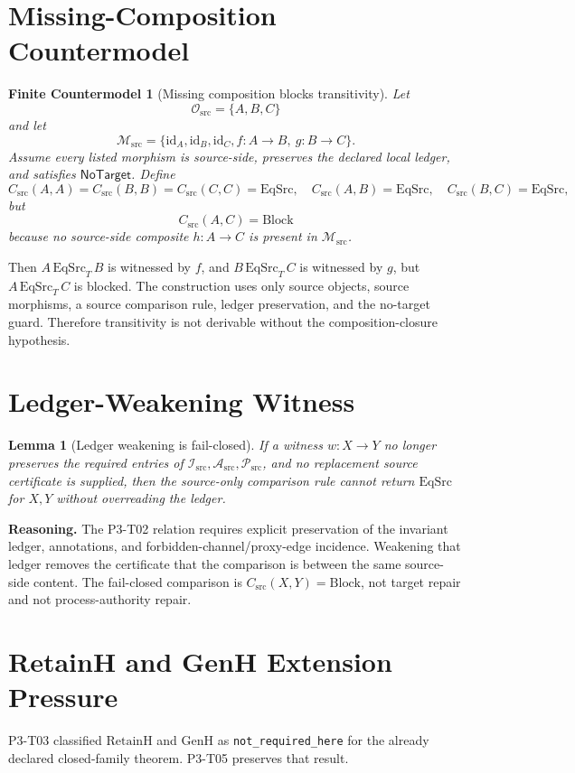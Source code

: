 \documentclass[11pt]{article}
\newcommand{\EqSrc}{\mathrm{EqSrc}}
\newcommand{\EqSrcT}{\mathrm{EqSrc}_{T}}
\newcommand{\Block}{\mathrm{Block}}
\newcommand{\RetainH}{\mathrm{RetainH}}
\newcommand{\GenH}{\mathrm{GenH}}
\newcommand{\Osrc}{\mathcal{O}_{\mathrm{src}}}
\newcommand{\Msrc}{\mathcal{M}_{\mathrm{src}}}
\newcommand{\Isrc}{\mathcal{I}_{\mathrm{src}}}
\newcommand{\Asrc}{\mathcal{A}_{\mathrm{src}}}
\newcommand{\Psrc}{\mathcal{P}_{\mathrm{src}}}
\newcommand{\Csrc}{C_{\mathrm{src}}}
\newcommand{\NoTarget}{\mathsf{NoTarget}}
\newtheorem{countermodel}{Finite Countermodel}
\newtheorem{lemma}{Lemma}
\begin{document}
\section{Missing-Composition Countermodel}

\begin{countermodel}[Missing composition blocks transitivity]
Let
\[
  \Osrc=\{A,B,C\}
\]
and let
\[
  \Msrc=\{\mathrm{id}_{A},\mathrm{id}_{B},\mathrm{id}_{C},
  f:A\to B,\ g:B\to C\}.
\]
Assume every listed morphism is source-side, preserves the declared local
ledger, and satisfies \(\NoTarget\). Define
\[
  \Csrc(A,A)=\Csrc(B,B)=\Csrc(C,C)=\EqSrc,
  \quad \Csrc(A,B)=\EqSrc,\quad \Csrc(B,C)=\EqSrc,
\]
but
\[
  \Csrc(A,C)=\Block
\]
because no source-side composite \(h:A\to C\) is present in \(\Msrc\).
\end{countermodel}

Then \(A\,\EqSrcT\,B\) is witnessed by \(f\), and \(B\,\EqSrcT\,C\) is
witnessed by \(g\), but \(A\,\EqSrcT\,C\) is blocked. The construction uses
only source objects, source morphisms, a source comparison rule, ledger
preservation, and the no-target guard. Therefore transitivity is not derivable
without the composition-closure hypothesis.

\section{Ledger-Weakening Witness}

\begin{lemma}[Ledger weakening is fail-closed]
If a witness \(w:X\to Y\) no longer preserves the required entries of
\(\Isrc,\Asrc,\Psrc\), and no replacement source certificate is supplied, then
the source-only comparison rule cannot return \(\EqSrc\) for \(X,Y\) without
overreading the ledger.
\end{lemma}

\textbf{Reasoning.} The P3-T02 relation requires explicit preservation of the
invariant ledger, annotations, and forbidden-channel/proxy-edge incidence.
Weakening that ledger removes the certificate that the comparison is between
the same source-side content. The fail-closed comparison is
\(\Csrc(X,Y)=\Block\), not target repair and not process-authority repair.

\section{RetainH and GenH Extension Pressure}

P3-T03 classified \(\RetainH\) and \(\GenH\) as
\texttt{not\_required\_here} for the already declared closed-family theorem.
P3-T05 preserves that result.
\end{document}
